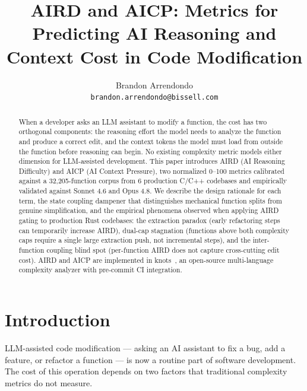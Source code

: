 \documentclass[10pt,twocolumn,letterpaper]{article}
\begin{document}
\title{AIRD and AICP: Metrics for Predicting AI Reasoning and\\
Context Cost in Code Modification}

\author{Brandon Arrendondo\\
{\tt\small brandon.arrendondo@bissell.com}}

\maketitle

\begin{abstract}
When a developer asks an LLM assistant to modify a function, the cost has
two orthogonal components: the reasoning effort the model needs to analyze
the function and produce a correct edit, and the context tokens the model
must load from outside the function before reasoning can begin.  No
existing complexity metric models either dimension for LLM-assisted
development.  This paper introduces AIRD (AI Reasoning Difficulty) and
AICP (AI Context Pressure), two normalized 0--100 metrics calibrated
against a 32,205-function corpus from 6 production C/C++ codebases and
empirically validated against Sonnet 4.6 and Opus 4.8.  We describe the
design rationale for each term, the state coupling dampener that
distinguishes mechanical function splits from genuine simplification, and
the empirical phenomena observed when applying AIRD gating to production
Rust codebases: the extraction paradox (early refactoring steps can
temporarily increase AIRD), dual-cap stagnation (functions above both
complexity caps require a single large extraction push, not incremental
steps), and the inter-function coupling blind spot (per-function AIRD
does not capture cross-cutting edit cost).  AIRD and AICP are implemented
in knots~\cite{knots}, an open-source multi-language complexity analyzer
with pre-commit CI integration.
\end{abstract}

\section{Introduction}
\label{sec:intro}

LLM-assisted code modification --- asking an AI assistant to fix a bug,
add a feature, or refactor a function --- is now a routine part of
software development.  The cost of this operation depends on two factors
that traditional complexity metrics do not measure.
\end{document}
